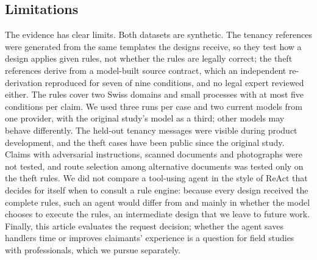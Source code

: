 \subsection{Limitations}
\label{sec:limitations}

The evidence has clear limits. Both datasets are synthetic. The tenancy references were generated from the same templates the designs receive, so they test how a design applies given rules, not whether the rules are legally correct; the theft references derive from a model-built source contract, which an independent re-derivation reproduced for seven of nine conditions, and no legal expert reviewed either. The rules cover two Swiss domains and small processes with at most five conditions per claim. We used three runs per case and two current models from one provider, with the original study's model as a third; other models may behave differently. The held-out tenancy messages were visible during product development, and the theft cases have been public since the original study. Claims with adversarial instructions, scanned documents and photographs were not tested, and route selection among alternative documents was tested only on the theft rules. We did not compare a tool-using agent in the style of ReAct \cite{yao2022react} that decides for itself when to consult a rule engine: because every design received the complete rules, such an agent would differ from  and \casepath mainly in whether the model chooses to execute the rules, an intermediate design that we leave to future work. Finally, this article evaluates the request decision; whether the agent saves handlers time or improves claimants' experience is a question for field studies with professionals, which we pursue separately.
